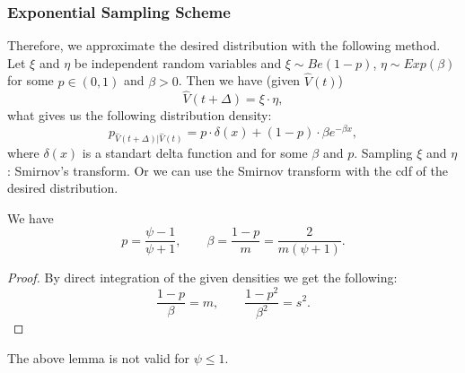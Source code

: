             \subsubsection{Exponential Sampling Scheme}
                Therefore, we approximate the desired distribution with the following method. Let $\xi$ and $\eta$ be independent random variables and  $\xi \sim Be(1-p)$, $\eta \sim Exp(\beta)$ for some $p \in (0, 1)$ and $\beta > 0$. Then we have (given $\hat{V}(t)$)
                \begin{equation}
                    \hat{V}(t+\Delta) = \xi\cdot\eta,
                \end{equation}
                what gives us the following distribution density:
                \begin{equation}
                    p_{\hat{V}(t+\Delta)\vert \hat{V}(t)} = p\cdot \delta(x) + (1-p) \cdot\beta e^{-\beta x},
                \end{equation}
                where $\delta(x)$ is a standart delta function and for some $\beta$ and $p$.
                Sampling $\xi$ and $\eta$: Smirnov's transform. Or we can use the Smirnov transform with the cdf of the desired distribution.
                \begin{lemma}
                    We have
                    \begin{equation}
                        p     = \frac{\psi - 1}{\psi + 1}, \qquad \beta = \frac{1-p}{m} = \frac{2}{m(\psi+1)}.
                    \end{equation}
                \end{lemma}
                \begin{proof}
                    {\color{red}By direct integration of the given densities we get the following:}
                    \begin{equation}
                        \frac{1-p}{\beta} = m, \qquad \frac{1-p^2}{\beta^2} = s^2.
                    \end{equation}
                \end{proof}
                \begin{remark}
                    The above lemma is not valid for $\psi \leq 1$.
                \end{remark}

